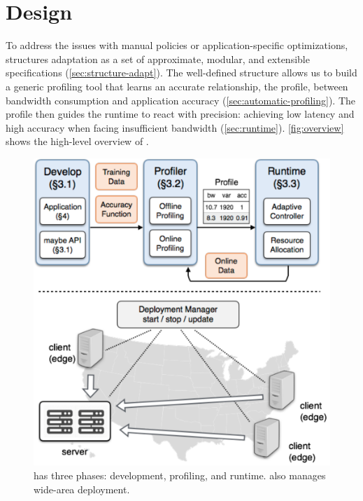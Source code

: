 \section{\sysname{} Design}
\label{sec:system}

To address the issues with manual policies or application-specific
optimizations, \sysname{} structures adaptation as a set of approximate,
modular, and extensible specifications (\autoref{sec:structure-adapt}). The
well-defined structure allows us to build a generic profiling tool that learns
an accurate relationship, the profile, between bandwidth consumption and
application accuracy (\autoref{sec:automatic-profiling}). The profile then
guides the runtime to react with precision: achieving low latency and high
accuracy when facing insufficient bandwidth
(\autoref{sec:runtime}). \autoref{fig:overview} shows the high-level overview of
\sysname{}.

\begin{figure}
  \centering
  \includegraphics[width=0.9\linewidth]{figures/system.pdf}
  \vspace{-0.5em}
  \caption{\sysname{} has three phases: development, profiling, and runtime.
    \sysname{} also manages wide-area deployment.}
  \label{fig:overview}
  \vspace{-0.5em}
\end{figure}





